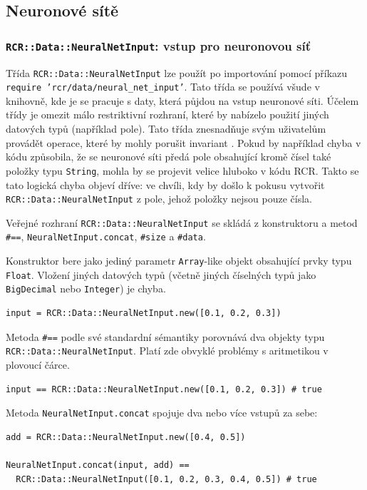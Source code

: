 \documentclass[a4paper]{article}
\begin{document}
\subsection{Neuronové sítě}
\subsubsection{\texttt{RCR::Data::NeuralNetInput}: vstup pro neuronovou síť}
Třída \texttt{RCR::Data::NeuralNetInput} lze použít po importování pomocí
příkazu
\hbox{\texttt{require 'rcr/data/neural\_net\_input'}}. Tato třída se používá všude v knihovně, kde
je se pracuje s daty, která půjdou na vstup neuronové síti. Účelem třídy
je omezit málo restriktivní rozhraní, které by nabízelo použití jiných datových
typů (například pole). Tato třída znesnadňuje svým uživatelům provádět operace,
které by mohly porušit invariant .
Pokud by například chyba v kódu způsobila, že se neuronové síti předá pole
obsahující kromě čísel také položky typu \texttt{String}, mohla by se projevit
velice hluboko v kódu RCR. Takto se tato logická chyba objeví dříve: ve chvíli,
kdy by došlo k pokusu vytvořit \texttt{RCR::Data::NeuralNetInput} z pole,
jehož položky nejsou pouze čísla.

Veřejné rozhraní \texttt{RCR::Data::NeuralNetInput} se skládá z konstruktoru a
metod \texttt{\#==}, \texttt{NeuralNetInput.concat}, \texttt{\#size} a \texttt{\#data}.

Konstruktor bere jako jediný parametr \texttt{Array}-like objekt obsahující
prvky typu \texttt{Float}. Vložení jiných datových typů (včetně jiných číselných
typů jako \texttt{BigDecimal} nebo \texttt{Integer}) je chyba.
\begin{lstlisting}
input = RCR::Data::NeuralNetInput.new([0.1, 0.2, 0.3])
\end{lstlisting}

Metoda \texttt{\#==} podle své standardní sémantiky porovnává dva objekty typu
\texttt{RCR::Data::NeuralNetInput}. Platí zde obvyklé problémy s aritmetikou
v plovoucí čárce.
\begin{lstlisting}
input == RCR::Data::NeuralNetInput.new([0.1, 0.2, 0.3]) # true
\end{lstlisting}

Metoda \texttt{NeuralNetInput.concat} spojuje dva nebo více vstupů za sebe:
\begin{lstlisting}
add = RCR::Data::NeuralNetInput.new([0.4, 0.5])

NeuralNetInput.concat(input, add) ==
  RCR::Data::NeuralNetInput([0.1, 0.2, 0.3, 0.4, 0.5]) # true
\end{lstlisting}
\end{document}
